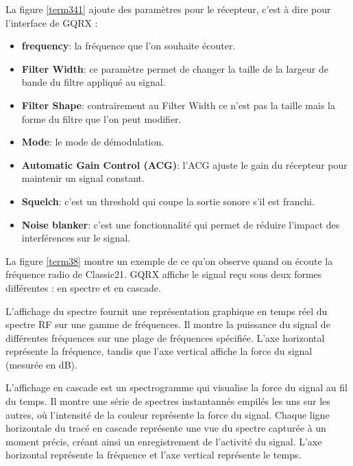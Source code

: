 \vspace{0.1cm}

La figure \ref{term341} ajoute des paramètres pour le récepteur, c'est à dire pour l'interface de GQRX :

\vspace{0.1cm}

\begin{itemize}
\item \textbf{frequency}: la fréquence que l'on souhaite écouter.
\item \textbf{Filter Width}: ce paramètre permet de changer la taille de la largeur de bande du filtre appliqué au signal.
\item \textbf{Filter Shape}: contrairement au Filter Width ce n'est pas la taille mais la forme du filtre que l'on peut modifier.
\item \textbf{Mode}: le mode de démodulation.
\item \textbf{Automatic Gain Control (ACG)}: l'ACG ajuste le gain du récepteur pour maintenir un signal constant.
\item \textbf{Squelch}: c'est un threshold qui coupe la sortie sonore s'il est franchi.
\item \textbf{Noise blanker}: c'est une fonctionnalité qui permet de réduire l'impact des interférences sur le signal.
\end{itemize}

\vspace{0.1cm}

La figure \ref{term38} montre un exemple de ce qu'on observe quand on écoute la fréquence radio de Classic21. GQRX affiche le signal reçu sous deux formes différentes : en spectre et en cascade.

\vspace{0.1cm}

L'affichage du spectre fournit une représentation graphique en temps réel du spectre RF sur une gamme de fréquences.
Il montre la puissance du signal de différentes fréquences sur une plage de fréquences spécifiée.
L'axe horizontal représente la fréquence, tandis que l'axe vertical affiche la force du signal (mesurée en dB).

\vspace{0.1cm}

L'affichage en cascade est un spectrogramme qui visualise la force du signal au fil du temps.
Il montre une série de spectres instantannés empilés les uns sur les autres, où l'intensité de la couleur représente la force du signal.
Chaque ligne horizontale du tracé en cascade représente une vue du spectre capturée à un moment précis, créant ainsi un enregistrement de l'activité du signal.
L'axe horizontal représente la fréquence et l'axe vertical représente le temps.

